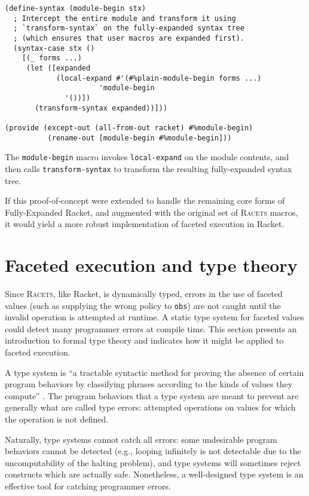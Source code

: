 \documentclass{article}
\begin{document}
\begin{lstlisting}
(define-syntax (module-begin stx)
  ; Intercept the entire module and transform it using
  ; `transform-syntax` on the fully-expanded syntax tree
  ; (which ensures that user macros are expanded first).
  (syntax-case stx ()
    [(_ forms ...)
     (let ([expanded
            (local-expand #'(#%plain-module-begin forms ...)
	                  'module-begin
			  '())])
       (transform-syntax expanded))]))

(provide (except-out (all-from-out racket) #%module-begin)
          (rename-out [module-begin #%module-begin]))
\end{lstlisting}

The \texttt{module-begin} macro invokes \texttt{local-expand} on the module contents, and then calls \texttt{transform-syntax} to transform the resulting fully-expanded syntax tree.

If this proof-of-concept were extended to handle the remaining core forms of Fully-Expanded Racket, and augmented with the original set of \textsc{Racets} macros, it would yield a more robust implementation of faceted execution in Racket.



\section{Faceted execution and type theory\label{sec:types}}
Since \textsc{Racets}, like Racket, is dynamically typed, errors in the use of faceted values (such as supplying the wrong policy to \texttt{obs}) are not caught until the invalid operation is attempted at runtime. A static type system for faceted values could detect many programmer errors at compile time. This section presents an introduction to formal type theory and indicates how it might be applied to faceted execution.

A type system is ``a tractable syntactic method for proving the absence of certain program behaviors by classifying phrases according to the kinds of values they compute'' \cite{types}. The program behaviors that a type system are meant to prevent are generally what are called type errors: attempted operations on values for which the operation is not defined.

Naturally, type systems cannot catch all errors: some undesirable program behaviors cannot be detected (e.g., looping infinitely is not detectable due to the uncomputability of the halting problem), and type systems will sometimes reject constructs which are actually safe. Nonetheless, a well-designed type system is an effective tool for catching programmer errors.
\end{document}

